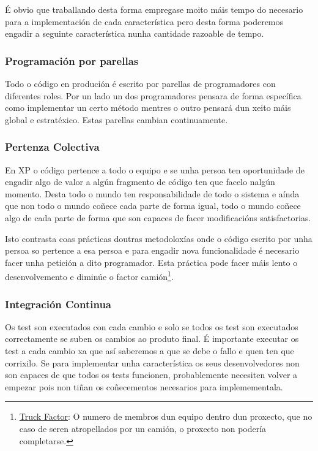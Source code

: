 É obvio que traballando desta forma empregase moito máis tempo do necesario para a implementación de cada característica pero desta forma poderemos engadir a seguinte característica nunha cantidade razoable de tempo.

\subsubsection{Programación por parellas}
Todo o código en produción é escrito por parellas de programadores con diferentes roles. Por un lado un dos programadores pensara de forma específica como implementar un certo método mentres o outro pensará dun xeito máis global e estratéxico. Estas parellas cambian continuamente.

\subsubsection{Pertenza Colectiva}
En XP o código pertence a todo o equipo e se unha persoa ten oportunidade de engadir algo de valor a algún fragmento de código ten que facelo nalgún momento. Desta todo o mundo ten responsabilidade de todo o sistema e aínda que non todo o mundo coñece cada parte de forma igual, todo o mundo coñece algo de cada parte de forma que son capaces de facer modificacións satisfactorias.

Isto contrasta coas prácticas doutras metodoloxías onde o código escrito por unha persoa so pertence a esa persoa e para engadir nova funcionalidade é necesario facer unha petición a dito programador. Esta práctica pode facer máis lento o desenvolvemento e diminúe o factor camión\footnote{\href{http://en.wikipedia.org/wiki/Bus\_factor}{Truck Factor}: O numero de membros dun equipo dentro dun proxecto, que no caso de seren atropellados por un camión, o proxecto non podería completarse.}.

\subsubsection{Integración Continua}
Os test son executados con cada cambio e solo se todos os test son executados correctamente se suben os cambios ao produto final. É importante executar os test a cada cambio xa que así saberemos a que se debe o fallo e quen ten que corrixilo. Se para implementar unha característica os seus desenvolvedores non son capaces de que todos os tests funcionen, probablemente necesiten volver a empezar pois non tiñan os coñecementos necesarios para implemementala. 


